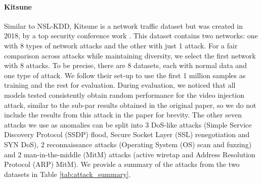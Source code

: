 \documentclass{article}
\begin{document}
\paragraph*{Kitsune}
Similar to NSL-KDD, Kitsune is a network traffic dataset but was created in 2018, by a top security conference work \citep{kitsune_dataset}. 
This dataset contains two networks: one with 8 types of network attacks and the other with just 1 attack.
For a fair comparison across attacks while maintaining diversity, we select the first network with 8 attacks.
To be precise, there are 8 datasets, each with normal data and one type of attack.
We follow their set-up to use the first 1 million samples as training and the rest for evaluation.
During evaluation, we noticed that all models tested consistently obtain random performance for the video injection attack, similar to the sub-par results obtained in the original paper, so we do not include the results from this attack in the paper for brevity.
The other seven attacks we use as anomalies can be split into 3 DoS-like attacks (Simple Service Discovery Protocol (SSDP) flood, Secure Socket Layer (SSL) renegotiation and SYN DoS), 2 reconnaissance attacks (Operating System (OS) scan and fuzzing) and 2 man-in-the-middle (MitM) attacks (active wiretap and Address Resolution Protocol (ARP) MitM).
We provide a summary of the attacks from the two datasets in Table \ref{tab:attack_summary}.
\end{document}
